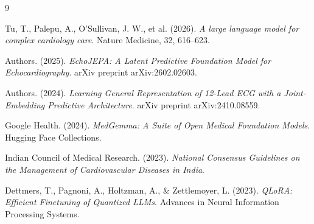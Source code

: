 \documentclass[11pt,a4paper]{article}
\begin{document}
\begin{thebibliography}{9}

Tu, T., Palepu, A., O'Sullivan, J. W., et al. (2026). \textit{A large language model for complex cardiology care}. Nature Medicine, 32, 616--623.

Authors. (2025). \textit{EchoJEPA: A Latent Predictive Foundation Model for Echocardiography}. arXiv preprint arXiv:2602.02603.

Authors. (2024). \textit{Learning General Representation of 12-Lead ECG with a Joint-Embedding Predictive Architecture}. arXiv preprint arXiv:2410.08559.

Google Health. (2024). \textit{MedGemma: A Suite of Open Medical Foundation Models}. Hugging Face Collections.

Indian Council of Medical Research. (2023). \textit{National Consensus Guidelines on the Management of Cardiovascular Diseases in India}.

Dettmers, T., Pagnoni, A., Holtzman, A., \& Zettlemoyer, L. (2023). \textit{QLoRA: Efficient Finetuning of Quantized LLMs}. Advances in Neural Information Processing Systems.

\end{thebibliography}
\end{document}
